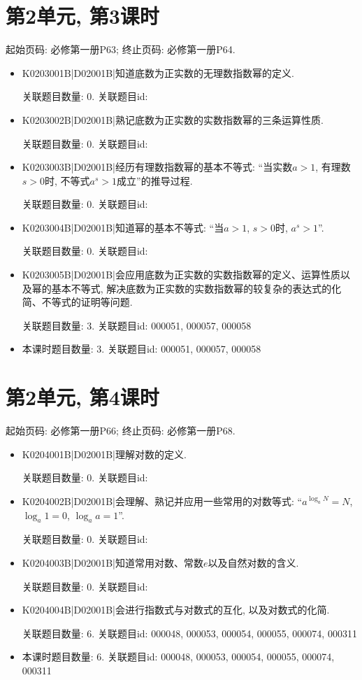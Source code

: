 \section*{第2单元, 第3课时}
起始页码: 必修第一册P63; 终止页码: 必修第一册P64.
\begin{itemize}
\item K0203001B|D02001B|知道底数为正实数的无理数指数幂的定义.

关联题目数量: 0. 关联题目id: 

\item K0203002B|D02001B|熟记底数为正实数的实数指数幂的三条运算性质.

关联题目数量: 0. 关联题目id: 

\item K0203003B|D02001B|经历有理数指数幂的基本不等式: ``当实数$a>1$, 有理数$s>0$时, 不等式$a^s>1$成立''的推导过程.

关联题目数量: 0. 关联题目id: 

\item K0203004B|D02001B|知道幂的基本不等式: ``当$a>1$, $s>0$时, $a^s>1$''.

关联题目数量: 0. 关联题目id: 

\item K0203005B|D02001B|会应用底数为正实数的实数指数幂的定义、运算性质以及幂的基本不等式, 解决底数为正实数的实数指数幂的较复杂的表达式的化简、不等式的证明等问题.

关联题目数量: 3. 关联题目id: 000051, 000057, 000058

\item 本课时题目数量: 3. 关联题目id: 000051, 000057, 000058

\end{itemize}

\section*{第2单元, 第4课时}
起始页码: 必修第一册P66; 终止页码: 必修第一册P68.
\begin{itemize}
\item K0204001B|D02001B|理解对数的定义.

关联题目数量: 0. 关联题目id: 

\item K0204002B|D02001B|会理解、熟记并应用一些常用的对数等式: ``$a^{\log_aN}=N$, $\log_a1=0$, $\log_aa=1$''.

关联题目数量: 0. 关联题目id: 

\item K0204003B|D02001B|知道常用对数、常数$e$以及自然对数的含义.

关联题目数量: 0. 关联题目id: 

\item K0204004B|D02001B|会进行指数式与对数式的互化, 以及对数式的化简.

关联题目数量: 6. 关联题目id: 000048, 000053, 000054, 000055, 000074, 000311

\item 本课时题目数量: 6. 关联题目id: 000048, 000053, 000054, 000055, 000074, 000311

\end{itemize}

